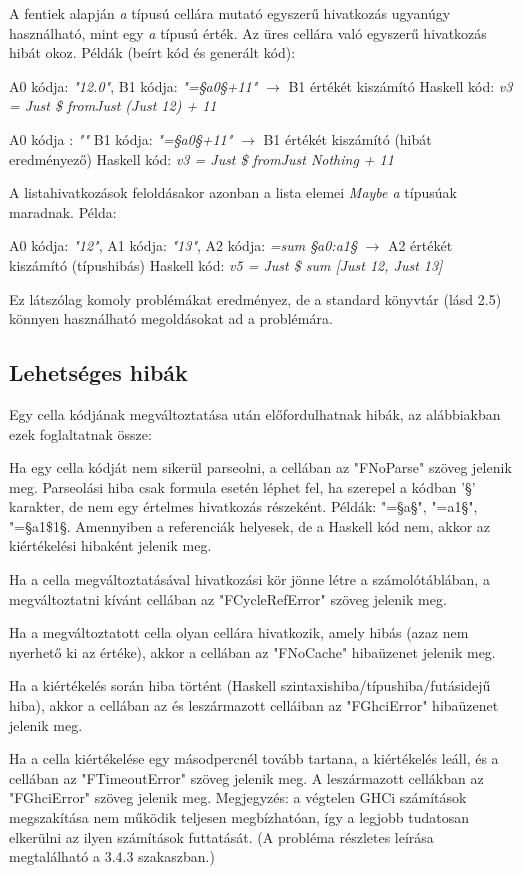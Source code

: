 A fentiek alapján \textit{a} típusú cellára mutató egyszerű hivatkozás ugyanúgy használható, mint egy \textit{a} típusú érték. Az üres cellára való egyszerű hivatkozás hibát okoz. Példák (beírt kód és generált kód):
\begin{compactenum}
	\item A0 kódja: \textit{"12.0"}, B1 kódja: \textit{"=§a0§+11"} $\rightarrow$ B1 értékét kiszámító Haskell kód: \textit{v3 = Just \$ fromJust (Just 12) + 11}
	\item A0 kódja : \textit{""} B1 kódja: \textit{"=§a0§+11"} $\rightarrow$ B1 értékét kiszámító (hibát eredményező) Haskell kód: \textit{v3 = Just \$ fromJust Nothing + 11}
\end{compactenum}

A listahivatkozások feloldásakor azonban a lista elemei \textit{Maybe a} típusúak maradnak. Példa:

A0 kódja: \textit{"12"}, A1 kódja: \textit{"13"}, A2 kódja: \textit{=sum §a0:a1§} $\rightarrow$ A2 értékét kiszámító (típushibás) Haskell kód: \textit{v5 = Just \$ sum [Just 12, Just 13]}

Ez látszólag komoly problémákat eredményez, de a standard könyvtár (lásd 2.5) könnyen használható megoldásokat ad a problémára.

\subsection{Lehetséges hibák}

Egy cella kódjának megváltoztatása után előfordulhatnak hibák, az alábbiakban ezek foglaltatnak össze:
\begin{compactenum}
	\item Ha egy cella kódját nem sikerül parseolni, a cellában az "FNoParse" szöveg jelenik meg. Parseolási hiba csak formula esetén léphet fel, ha szerepel a kódban '§' karakter, de nem egy értelmes hivatkozás részeként. Példák: "=§a§", "=a1§", "=§a1\$1§. Amennyiben a referenciák helyesek, de a Haskell kód nem, akkor az kiértékelési hibaként jelenik meg.
	\item Ha a cella megváltoztatásával hivatkozási kör jönne létre a számolótáblában, a megváltoztatni kívánt cellában az "FCycleRefError" szöveg jelenik meg.
	\item Ha a megváltoztatott cella olyan cellára hivatkozik, amely hibás (azaz nem nyerhető ki az értéke), akkor a cellában az "FNoCache" hibaüzenet jelenik meg. 
	\item Ha a kiértékelés során hiba történt (Haskell szintaxishiba/típushiba/futásidejű hiba), akkor a cellában az és leszármazott celláiban az "FGhciError" hibaüzenet jelenik meg.
	\item Ha a cella kiértékelése egy másodpercnél tovább tartana, a kiértékelés leáll, és a cellában az "FTimeoutError" szöveg jelenik meg. A leszármazott cellákban az "FGhciError" szöveg jelenik meg. Megjegyzés: a végtelen GHCi számítások megszakítása nem működik teljesen megbízhatóan, így a legjobb tudatosan elkerülni az ilyen számítások futtatását. (A probléma részletes leírása megtalálható a 3.4.3 szakaszban.)
\end{compactenum}
	

